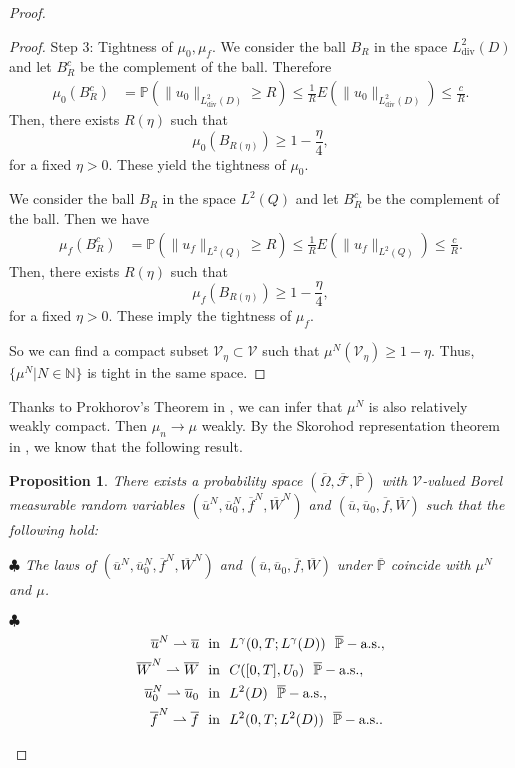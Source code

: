 \documentclass[reqno]{amsart}
\newtheorem{Proposition}{Proposition}[section]
\theoremstyle{definition}
\theoremstyle{remark}
\numberwithin{equation}{section} \allowdisplaybreaks
\begin{document}
\begin{proof}
\begin{proof}
{Step 3: Tightness of $\mu_0,\mu_f$.} We consider the ball $B_R$ in
the space $L^2_{\text{div}}(D)$ and let $B_R^c$ be the complement of
the ball. Therefore
\begin{align*}
\mu_0(B_R^c)&=\mathbb{P}(\|u_0\|_{L^2_{\text{div}}(D)}\geq R)
\leq
\frac{1}{R}E\left(\|u_0\|_{L^2_{\text{div}}(D)}\right)\leq\frac{c}{R}.
\end{align*}
Then, there exists $R(\eta)$ such that
$$\mu_{0}(B_{R(\eta)})\geq 1-\frac{\eta}{4},$$
for a fixed $\eta>0$. These yield the tightness of $\mu_{0}$.

We consider the ball $B_R$
in the space $L^2(Q)$ and let $B_R^c$ be the complement of the ball.
Then we have
\begin{align*}
\mu_f(B_R^c)&=\mathbb{P}(\|u_f\|_{L^2(Q)}\geq R)
\leq
\frac{1}{R}E\left(\|u_f\|_{L^2(Q)}\right)\leq\frac{c}{R}.
\end{align*}
Then, there exists $R(\eta)$ such that
$$\mu_{f}(B_{R(\eta)})\geq 1-\frac{\eta}{4},$$
for a fixed $\eta>0$. These imply the tightness of $\mu_{f}$.




So we can find a compact subset $\mathcal{V}_\eta\subset\mathcal{V}$
such that $\mu^N(\mathcal{V}_\eta)\geq 1-\eta$. Thus,
$\{\mu^N|N\in\mathbb{N}\}$ is tight in the same space.


\end{proof}





Thanks to Prokhorov's Theorem in \cite{NISW}, we can infer that
$\mu^N$ is also relatively weakly compact. Then %
$\mu_n\to\mu$ weakly. By the Skorohod representation theorem in
\cite{NISW}, we know that the following result.
\begin{Proposition}
There exists a probability space
$(\overline{\Omega},\overline{\mathscr{F}},\overline{\mathbb{P}})$
with $\mathcal{V}$-valued Borel measurable random variables
$(\overline{u}^N,\overline{u}^N_0,\overline{f}^N,\overline{W}^N)$
and $(\overline{u},\overline{u}_0,\overline{f},\overline{W})$ such
that the following hold:

$\clubsuit$ The laws of
$(\overline{u}^N,\overline{u}^N_0,\overline{f}^N,\overline{W}^N)$
and $(\overline{u},\overline{u}_0,\overline{f},\overline{W})$ under
$\overline{\mathbb{P}}$ coincide with $\mu^N$ and $\mu$.

$\clubsuit$
\begin{align*}
\overline{u}^N\rightharpoonup \overline{u}&  ~\mbox{ \rm  in }~
L^{\gamma}(0,T;L^\gamma(D))\ \ \overline{\mathbb{P}}-\text{a.s.},\\
\overline{W}^N\rightharpoonup  \overline{W}& ~
 \mbox{ \rm  in }~   C([0,T],{U}_0)\ \ \overline{\mathbb{P}}-\text{a.s.},\\
\overline{u}_0^N\rightharpoonup \overline{u}_0&  ~\mbox{  \rm in }~
L^{2}(D)\ \ \overline{\mathbb{P}}-\text{a.s.},\\
 \overline{f}^N\rightharpoonup \overline{f}&  ~\mbox{ \rm  in }~
L^{2}(0,T;L^2(D))\ \ \overline{\mathbb{P}}-\text{a.s.}.
\end{align*}


\end{Proposition}
\end{proof}
\end{document}
